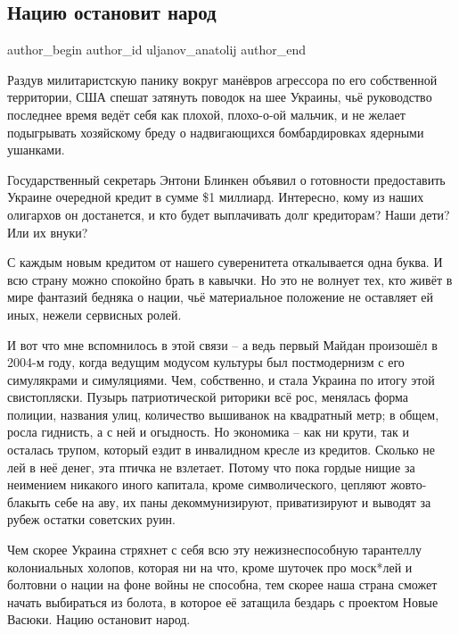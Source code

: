  
 
 
 
 
 
\subsection{Нацию остановит народ}
\label{sec:15_02_2022.fb.uljanov_anatolij.1.naciu_ostanovit_narod}
 
\ifcmt
 author_begin
   author_id uljanov_anatolij
 author_end
\fi

Раздув милитаристскую панику вокруг манёвров агрессора по его собственной
территории, США спешат затянуть поводок на шее Украины, чьё руководство
последнее время ведёт себя как плохой, плохо-о-ой мальчик, и не желает
подыгрывать хозяйскому бреду о надвигающихся бомбардировках ядерными ушанками. 


Государственный секретарь Энтони Блинкен объявил о готовности предоставить
Украине очередной кредит в сумме \$1 миллиард. Интересно, кому из наших
олигархов он достанется, и кто будет выплачивать долг кредиторам? Наши дети?
Или их внуки? 

С каждым новым кредитом от нашего суверенитета откалывается одна буква. И всю
страну можно спокойно брать в кавычки. Но это не волнует тех, кто живёт в мире
фантазий бедняка о нации, чьё материальное положение не оставляет ей иных,
нежели сервисных ролей. 

И вот что мне вспомнилось в этой связи – а ведь первый Майдан произошёл в
2004-м году, когда ведущим модусом культуры был постмодернизм с его симулякрами
и симуляциями. Чем, собственно, и стала Украина по итогу этой свистопляски.
Пузырь патриотической риторики всё рос, менялась форма полиции, названия улиц,
количество вышиванок на квадратный метр; в общем, росла гиднисть, а с ней и
огыдность. Но экономика – как ни крути, так и осталась трупом, который ездит в
инвалидном кресле из кредитов. Сколько не лей в неё денег, эта птичка не
взлетает. Потому что пока гордые нищие за неимением никакого иного капитала,
кроме символического, цепляют жовто-блакыть себе на аву, их паны
декоммунизируют, приватизируют и выводят за рубеж остатки советских руин.

Чем скорее Украина стряхнет с себя всю эту нежизнеспособную тарантеллу
колониальных холопов, которая ни на что, кроме шуточек про моск*лей и болтовни
о нации на фоне войны не способна, тем скорее наша страна сможет начать
выбираться из болота, в которое её затащила бездарь с проектом Новые Васюки.
Нацию остановит народ.
